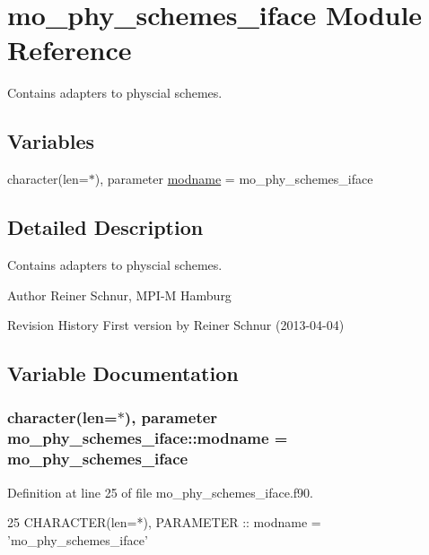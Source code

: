 \hypertarget{namespacemo__phy__schemes__iface}{}\section{mo\+\_\+phy\+\_\+schemes\+\_\+iface Module Reference}
\label{namespacemo__phy__schemes__iface}


Contains adapters to physcial schemes.  


\subsection*{Variables}
\begin{DoxyCompactItemize}
\item 
character(len=$\ast$), parameter \hyperlink{namespacemo__phy__schemes__iface_ad26c92d4f0618c6e9598f1e1871f08fa}{modname} = \textquotesingle{}mo\+\_\+phy\+\_\+schemes\+\_\+iface\textquotesingle{}
\end{DoxyCompactItemize}


\subsection{Detailed Description}
Contains adapters to physcial schemes. 

\begin{DoxyAuthor}{Author}
Reiner Schnur, M\+P\+I-\/\+M Hamburg
\end{DoxyAuthor}
\begin{DoxyParagraph}{Revision History}
First version by Reiner Schnur (2013-\/04-\/04) 
\end{DoxyParagraph}


\subsection{Variable Documentation}
\hypertarget{namespacemo__phy__schemes__iface_ad26c92d4f0618c6e9598f1e1871f08fa}{}
\subsubsection[{modname}]{\setlength{\rightskip}{0pt plus 5cm}character(len=$\ast$), parameter mo\+\_\+phy\+\_\+schemes\+\_\+iface\+::modname = \textquotesingle{}mo\+\_\+phy\+\_\+schemes\+\_\+iface\textquotesingle{}}\label{namespacemo__phy__schemes__iface_ad26c92d4f0618c6e9598f1e1871f08fa}


Definition at line 25 of file mo\+\_\+phy\+\_\+schemes\+\_\+iface.\+f90.


\begin{DoxyCode}
25   \textcolor{keywordtype}{CHARACTER(len=*)}, \textcolor{keywordtype}{PARAMETER} :: modname = \textcolor{stringliteral}{'mo\_phy\_schemes\_iface'}
\end{DoxyCode}
